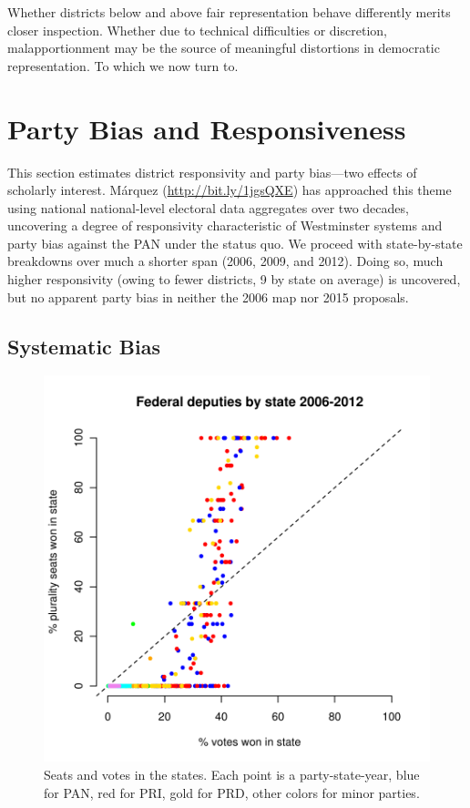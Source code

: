 \documentclass[letter,12pt]{article}
\begin{document}

Whether districts below and above fair representation behave differently merits closer inspection. Whether due to technical difficulties or discretion, malapportionment may be the source of meaningful distortions in democratic representation. To which we now turn to. 

\section{Party Bias and Responsiveness}

This section estimates district responsivity and party bias---two effects of scholarly interest. M\'arquez (\href{http://bit.ly/1jgsQXE}{\url{http://bit.ly/1jgsQXE}}) has approached this theme using national national-level electoral data aggregates over two decades, uncovering a degree of responsivity characteristic of Westminster systems and party bias against the PAN under the status quo. We proceed with state-by-state breakdowns over much a shorter span (2006, 2009, and 2012). Doing so, much higher responsivity (owing to fewer districts, 9 by state on average) is uncovered, but no apparent party bias in neither the 2006 map nor 2015 proposals. 

\subsection{Systematic Bias}

\begin{figure}
\begin{center}
    \includegraphics[width=.6\columnwidth]{resXedo20062012.pdf} 
\caption{Seats and votes in the states. Each point is a party-state-year, blue for PAN, red for PRI, gold for PRD, other colors for minor parties.}\label{F:seatsVotes}
\end{center}
\end{figure}
\end{document}
